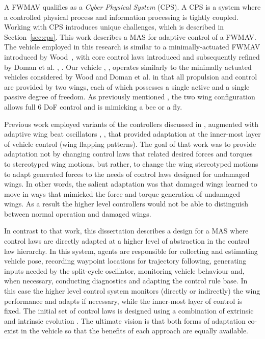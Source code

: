 A FWMAV qualifies as a \textit{Cyber Physical System} (CPS). A CPS is a system where a controlled physical process and information processing is tightly coupled. Working with CPS introduces unique challenges, which is described in Section~\ref{sec:cps}. This work describes a MAS for adaptive control of a FWMAV. The vehicle employed in this research is
similar to a minimally-actuated FWMAV introduced by Wood~\cite{Wood2008}, \cite{robobees} with core control laws introduced and subsequently refined by Doman et al. \cite{afrl1}, \cite{afrl2}. Our vehicle \cite{Perseghetti}, \cite{Boddhu}, \cite{Botha} operates similarly to the minimally actuated vehicles considered by Wood and Doman et al. in that all propulsion and control are provided by two wings, each of which possesses a single active and a single passive degree of freedom. As previously mentioned \cite{afrl1}, the two wing configuration allows full 6 DoF control and is mimicking a bee or a fly.

Previous work employed variants of the controllers discussed in \cite{afrl1}, \cite{afrl2} augmented with adaptive wing beat oscillators \cite{gallagher}, \cite{Gallagher2012a}, \cite{Gallagher3} that provided adaptation at the inner-most layer of vehicle control (wing flapping patterns). The goal of that work was to provide adaptation not by changing control laws that related desired forces and torques to stereotyped wing motions, but rather, to change the wing stereotyped motions to adapt generated forces to the needs of control laws designed for undamaged wings. In other words, the salient adaptation was that damaged wings learned to move in ways that mimicked the force and torque generation of undamaged wings. As a result the higher level controllers would not be able to distinguish between normal operation and damaged wings.

In contrast to that work, this dissertation describes a design for a MAS where control laws are directly adapted at a higher level of abstraction in the control law hierarchy. In this system, agents are responsible for collecting and estimating vehicle pose, recording waypoint locations for trajectory following, generating inputs needed by the split-cycle oscillator, monitoring vehicle behaviour and, when necessary, conducting diagnostics and adapting the control rule base. In this case the higher level control system monitors (directly or indirectly) the wing performance and adapts if necessary, while the inner-most layer of control is fixed. The initial set of control laws is designed using a combination of extrinsic and intrinsic evolution \cite{Tyrrell}. The ultimate vision is that both forms of adaptation co-exist in the vehicle so that the benefits of each approach are equally available. 



